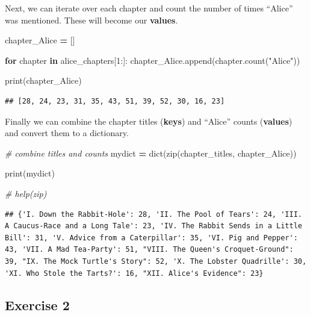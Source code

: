 \documentclass[]{book}
\newenvironment{Shaded}{\begin{snugshade}}{\end{snugshade}}
\newcommand{\BuiltInTok}[1]{#1}
\newcommand{\CommentTok}[1]{\textcolor[rgb]{0.56,0.35,0.01}{\textit{#1}}}
\newcommand{\ControlFlowTok}[1]{\textcolor[rgb]{0.13,0.29,0.53}{\textbf{#1}}}
\newcommand{\DecValTok}[1]{\textcolor[rgb]{0.00,0.00,0.81}{#1}}
\newcommand{\KeywordTok}[1]{\textcolor[rgb]{0.13,0.29,0.53}{\textbf{#1}}}
\newcommand{\NormalTok}[1]{#1}
\newcommand{\OperatorTok}[1]{\textcolor[rgb]{0.81,0.36,0.00}{\textbf{#1}}}
\newcommand{\StringTok}[1]{\textcolor[rgb]{0.31,0.60,0.02}{#1}}
\begin{document}
Next, we can iterate over each chapter and count the number of times ``Alice'' was mentioned. These will become our \textbf{values}.

\begin{Shaded}
\begin{Highlighting}[]
\NormalTok{chapter_Alice }\OperatorTok{=}\NormalTok{ []}

\ControlFlowTok{for}\NormalTok{ chapter }\KeywordTok{in}\NormalTok{ alice_chapters[}\DecValTok{1}\NormalTok{:]:}
\NormalTok{    chapter_Alice.append(chapter.count(}\StringTok{"Alice"}\NormalTok{))}

\BuiltInTok{print}\NormalTok{(chapter_Alice)  }
\end{Highlighting}
\end{Shaded}

\begin{verbatim}
## [28, 24, 23, 31, 35, 43, 51, 39, 52, 30, 16, 23]
\end{verbatim}

Finally we can combine the chapter titles (\textbf{keys}) and ``Alice'' counts (\textbf{values}) and convert them to a dictionary.

\begin{Shaded}
\begin{Highlighting}[]
\CommentTok{# combine titles and counts}
\NormalTok{mydict }\OperatorTok{=} \BuiltInTok{dict}\NormalTok{(}\BuiltInTok{zip}\NormalTok{(chapter_titles, chapter_Alice))}

\BuiltInTok{print}\NormalTok{(mydict)}

\CommentTok{# help(zip)         }
\end{Highlighting}
\end{Shaded}

\begin{verbatim}
## {'I. Down the Rabbit-Hole': 28, 'II. The Pool of Tears': 24, 'III. A Caucus-Race and a Long Tale': 23, 'IV. The Rabbit Sends in a Little Bill': 31, 'V. Advice from a Caterpillar': 35, 'VI. Pig and Pepper': 43, 'VII. A Mad Tea-Party': 51, "VIII. The Queen's Croquet-Ground": 39, "IX. The Mock Turtle's Story": 52, 'X. The Lobster Quadrille': 30, 'XI. Who Stole the Tarts?': 16, "XII. Alice's Evidence": 23}
\end{verbatim}

\hypertarget{exercise-2-3}{%
\subsection{Exercise 2}\label{exercise-2-3}}
\end{document}
